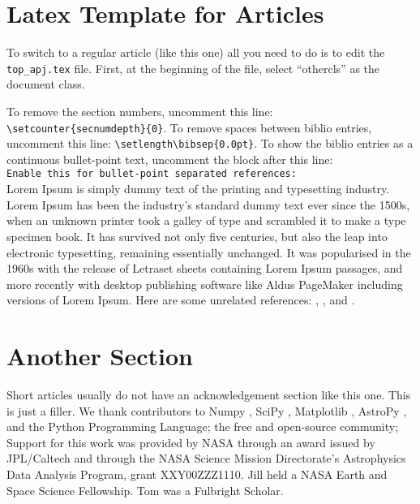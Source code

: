 



\section{Latex Template for Articles}

To switch to a regular article (like this one) all you need to do is
to edit the \verb+top_apj.tex+ file. First, at the beginning of the
file, select ``othercls'' as the document class.


To remove the section numbers, uncomment this line:
\verb+\setcounter{secnumdepth}{0}+.
To remove spaces between biblio entries, uncomment this line:
\verb+\setlength\bibsep{0.0pt}+.
To show the biblio entries as a continuous bullet-point text,
uncomment the block after this line:\\
\verb+Enable this for bullet-point separated references:+\\


Lorem Ipsum is simply dummy text of the printing and typesetting
industry. Lorem Ipsum has been the industry's standard dummy text ever
since the 1500s, when an unknown printer took a galley of type and
scrambled it to make a type specimen book. It has survived not only
five centuries, but also the leap into electronic typesetting,
remaining essentially unchanged. It was popularised in the 1960s with
the release of Letraset sheets containing Lorem Ipsum passages, and
more recently with desktop publishing software like Aldus PageMaker
including versions of Lorem Ipsum.
Here are some unrelated references:
\citet{Curtis1917paspIslandUniverseTheory},
\citet{Shapley1918apjDistanceGlobularClusters}, and 
\citet{Slipher1913lobAndromedaRarialVelocity}.



\section{Another Section}

Short articles usually do not have an acknowledgement section like
this one.  This is just a filler. We thank contributors to Numpy
\citep{vanderWaltEtal2011numpy}, SciPy \citep{JonesEtal2001scipy},
Matplotlib \citep{Hunter2007ieeeMatplotlib}, AstroPy
\citep{Astropy2013aaAstroPy}, and the Python Programming Language; the
free and open-source community; Support for this work was provided by
NASA through an award issued by JPL/Caltech and through the NASA
Science Mission Directorate's Astrophysics Data Analysis Program,
grant XXY00ZZZ1110.  Jill held a NASA Earth and Space Science
Fellowship.  Tom was a Fulbright Scholar.




